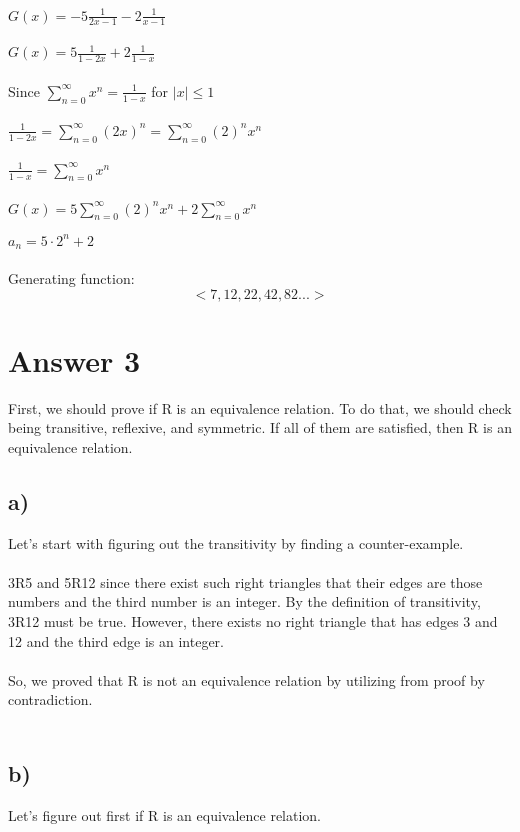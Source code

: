 \documentclass[12pt]{article}
\begin{document}
$G(x) = -5 \frac{1}{2x-1} -2 \frac{1}{x-1}$\\\\
$G(x) = 5 \frac{1}{1-2x} + 2 \frac{1}{1-x}$\\\\

Since $\sum_{n=0}^{\infty}x^n = \frac{1}{1-x}$ for $|x| \leq 1$\\\\

\noindent $\frac{1}{1-2x}= \sum_{n=0}^{\infty}(2x)^n = \sum_{n=0}^{\infty}(2)^n x^n$\\\\
$\frac{1}{1-x} = \sum_{n=0}^{\infty}x^n$\\\\

$G(x) = 5 \sum_{n=0}^{\infty}(2)^n x^n + 2 \sum_{n=0}^{\infty}x^n$

$a_n = 5\cdot 2^n + 2$\\\\

Generating function:
$$<7,12,22,42,82...>$$

\section*{Answer 3}
First, we should prove if R is an equivalence relation. To do that, we should check being transitive, reflexive, and symmetric. If all of them are satisfied, then R is an equivalence relation.
\subsection*{a) }
Let's start with figuring out the transitivity by finding a counter-example.\\\\

3R5 and 5R12 since there exist such right triangles that their edges are those numbers and the third number is an integer. By the definition of transitivity, 3R12 must be true. However, there exists no right triangle that has edges 3 and 12 and the third edge is an integer. \\\\

So, we proved that R is not an equivalence relation by utilizing from proof by contradiction.\\\\

\subsection*{b) }
Let's figure out first if R is an equivalence relation.\\\\
\end{document}
